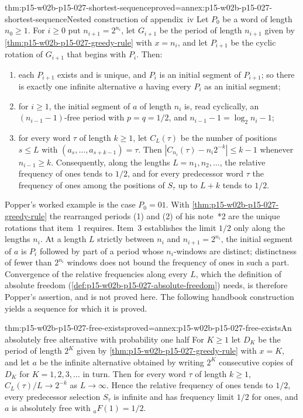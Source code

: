 \begin{hbtheorem}{thm:p15-w02b-p15-027-shortest-sequence}{proved=annex:p15-w02b-p15-027-shortest-sequence}{Nested construction of appendix~iv}
Let \(P_0\) be a word of length \(n_0\geq1\). For \(i\geq0\) put
\(n_{i+1}=2^{n_i}\), let \(G_{i+1}\) be the period of length
\(n_{i+1}\) given by \cref{thm:p15-w02b-p15-027-greedy-rule} with
\(x=n_i\), and let \(P_{i+1}\) be the cyclic rotation of \(G_{i+1}\) that
begins with \(P_i\). Then:
\begin{enumerate}
\item each \(P_{i+1}\) exists and is unique, and \(P_i\) is an initial
  segment of \(P_{i+1}\); so there is exactly one infinite alternative
  \(a\) having every \(P_i\) as an initial segment;
\item for \(i\geq1\), the initial segment of \(a\) of length \(n_i\) is,
  read cyclically, an \((n_{i-1}-1)\)-free period with \(p=q=1/2\), and
  \(n_{i-1}-1=\log_2n_i-1\);
\item for every word \(\tau\) of length \(k\geq1\), let \(C_L(\tau)\) be
  the number of positions \(s\leq L\) with
  \((a_s,\ldots,a_{s+k-1})=\tau\). Then
  \(|C_{n_i}(\tau)-n_i2^{-k}|\leq k-1\) whenever \(n_{i-1}\geq k\).
  Consequently, along the lengths \(L=n_1,n_2,\ldots\), the relative
  frequency of ones tends to \(1/2\), and for every predecessor word
  \(\tau\) the frequency of ones among the positions of \(S_\tau\) up to
  \(L+k\) tends to \(1/2\).
\end{enumerate}
\end{hbtheorem}

Popper's worked example is the case \(P_0=01\). With
\cref{thm:p15-w02b-p15-027-greedy-rule} the rearranged periods (1) and
(2) of his note~*2 are the unique rotations that item~1 requires. Item~3
establishes the limit \(1/2\) only along the lengths \(n_i\). At a length
\(L\) strictly between \(n_i\) and \(n_{i+1}=2^{n_i}\), the initial segment
of \(a\) is \(P_i\) followed by part of a period whose \(n_i\)-windows are
distinct; distinctness of fewer than \(2^{n_i}\) windows does not bound
the frequency of ones in such a part. Convergence of the relative
frequencies along every \(L\), which the definition of absolute freedom
(\cref{def:p15-w02b-p15-027-absolute-freedom}) needs, is therefore
Popper's assertion, and is not proved here. The following handbook
construction yields a sequence for which it is proved.

\begin{hbtheorem}{thm:p15-w02b-p15-027-free-exists}{proved=annex:p15-w02b-p15-027-free-exists}{An absolutely free alternative with probability one half}
For \(K\geq1\) let \(D_K\) be the period of length \(2^K\) given by
\cref{thm:p15-w02b-p15-027-greedy-rule} with \(x=K\), and let \(a\) be the
infinite alternative obtained by writing \(2^K\) consecutive copies of
\(D_K\) for \(K=1,2,3,\ldots\) in turn. Then for every word \(\tau\) of
length \(k\geq1\), \(C_L(\tau)/L\to2^{-k}\) as \(L\to\infty\). Hence the
relative frequency of ones tends to \(1/2\), every predecessor
selection \(S_\tau\) is infinite and has frequency limit \(1/2\) for ones,
and \(a\) is absolutely free with \({}_{a}F(1)=1/2\).
\end{hbtheorem}

